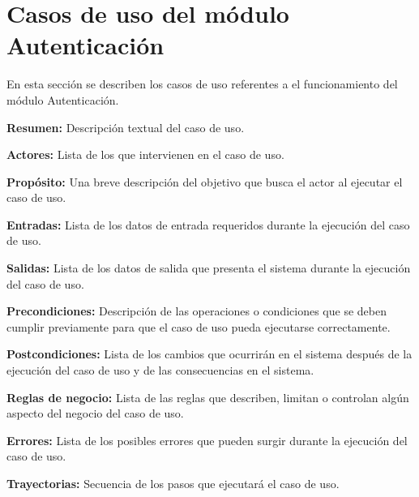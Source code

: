 
\section{Casos de uso del módulo Autenticación}
En esta sección se describen los casos de uso referentes a el funcionamiento del módulo Autenticación. \bigskip

     \begin{objetivos}
	\item {\bf Resumen:} Descripción textual del caso de uso.
	\item {\bf Actores:} Lista de los que intervienen en el caso de uso.
	\item {\bf Propósito:} Una breve descripción del objetivo que busca el actor al ejecutar el caso de uso.
	\item {\bf Entradas:} Lista de los datos de entrada requeridos durante la ejecución del caso de uso.
	\item {\bf Salidas:} Lista de los datos de salida que presenta el sistema durante la ejecución del caso de uso.
	\item {\bf Precondiciones:} Descripción de las operaciones o condiciones que se deben cumplir previamente para que el caso de uso pueda ejecutarse correctamente.
	\item {\bf Postcondiciones:} Lista de los cambios que ocurrirán en el sistema después de la ejecución del caso de uso y de las consecuencias en el sistema.
	\item {\bf Reglas de negocio:} Lista de las reglas que describen, limitan o controlan algún aspecto del negocio del caso de uso.
	\item {\bf Errores:} Lista de los posibles errores que pueden surgir durante la ejecución del caso de uso.
	\item {\bf Trayectorias:} Secuencia de los pasos que ejecutará el caso de uso.
    \end{objetivos}


